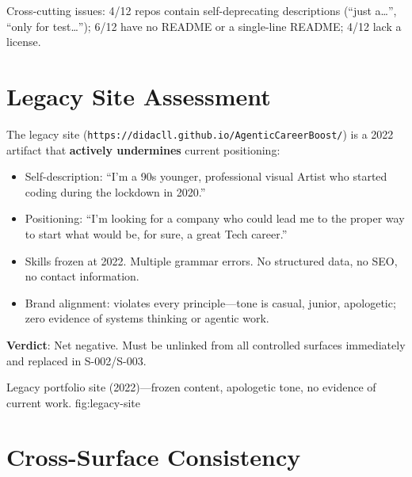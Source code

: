 \documentclass[a4paper,11pt,openany]{report}
\begin{document}
Cross-cutting issues: 4/12 repos contain self-deprecating descriptions
(``just a\ldots'', ``only for test\ldots''); 6/12 have no README or a
single-line README; 4/12 lack a license.

\section{Legacy Site Assessment}

The legacy site (\texttt{https://didacll.github.io/AgenticCareerBoost/}) is a 2022
artifact that \textbf{actively undermines} current positioning:

\begin{itemize}
  \item Self-description: ``I'm a 90s younger, professional visual Artist who
    started coding during the lockdown in 2020.''
  \item Positioning: ``I'm looking for a company who could lead me to the
    proper way to start what would be, for sure, a great Tech career.''
  \item Skills frozen at 2022. Multiple grammar errors. No structured data,
    no SEO, no contact information.
  \item Brand alignment: violates every principle---tone is casual, junior,
    apologetic; zero evidence of systems thinking or agentic work.
\end{itemize}

\textbf{Verdict}: Net negative. Must be unlinked from all controlled surfaces
immediately and replaced in S-002/S-003.

%
  {Legacy portfolio site (2022)---frozen content, apologetic tone, no evidence of current work.}%
  {fig:legacy-site}

\section{Cross-Surface Consistency}
\end{document}
